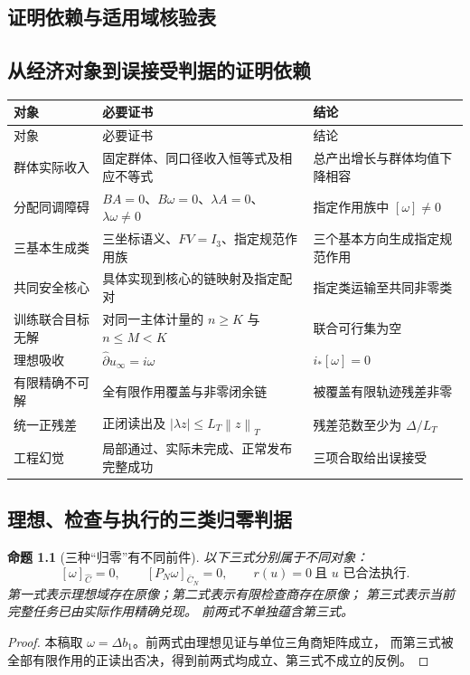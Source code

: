 \documentclass[12pt,a4paper,openany]{report}
\newtheorem{proposition}{命题}[chapter]
\numberwithin{equation}{chapter}
\newcommand{\chat}{\widehat C}
\newcommand{\Norm}[1]{\left\lVert#1\right\rVert}
\begin{document}
\begin{CJK*}{UTF8}{gkai}
\appendix

\chapter{证明依赖与适用域核验表}
\label{app:dependencies}

\section{从经济对象到误接受判据的证明依赖}

\begin{center}
\small
\begin{longtable}{P{0.23\textwidth}P{0.39\textwidth}P{0.29\textwidth}}
\toprule
对象 & 必要证书 & 结论\\
\midrule
\endfirsthead
\toprule
对象 & 必要证书 & 结论\\
\midrule
\endhead
群体实际收入
& 固定群体、同口径收入恒等式及相应不等式
& 总产出增长与群体均值下降相容\\
分配同调障碍
& $BA=0$、$B\omega=0$、$\lambda A=0$、$\lambda\omega\ne0$
& 指定作用族中 $[\omega]\ne0$\\
三基本生成类
& 三坐标语义、$FV=I_3$、指定规范作用族
& 三个基本方向生成指定规范作用\\
共同安全核心
& 具体实现到核心的链映射及指定配对
& 指定类运输至共同非零类\\
训练联合目标无解
& 对同一主体计量的 $n\ge K$ 与 $n\le M<K$
& 联合可行集为空\\
理想吸收
& $\widehat\partial u_\infty=i\omega$
& $i_*[\omega]=0$\\
有限精确不可解
& 全有限作用覆盖与非零闭余链
& 被覆盖有限轨迹残差非零\\
统一正残差
& 正闭读出及 $|\lambda z|\le L_T\Norm z_T$
& 残差范数至少为 $\Delta/L_T$\\
工程幻觉
& 局部通过、实际未完成、正常发布完整成功
& 三项合取给出误接受\\
\bottomrule
\end{longtable}
\end{center}

\section{理想、检查与执行的三类归零判据}

\begin{proposition}[三种“归零”有不同前件]
以下三式分别属于不同对象：
\[
 [\omega]_{\chat}=0,\qquad
 [P_N\omega]_{\bar C_N}=0,\qquad
 r(u)=0\ \text{且 $u$ 已合法执行}.
\]
第一式表示理想域存在原像；第二式表示有限检查商存在原像；
第三式表示当前完整任务已由实际作用精确兑现。
前两式不单独蕴含第三式。
\end{proposition}
\begin{proof}
本稿取 $\omega=\Delta b_1$。前两式由理想见证与单位三角商矩阵成立，
而第三式被全部有限作用的正读出否决，得到前两式均成立、第三式不成立的反例。
\end{proof}


\end{CJK*}
\end{document}
